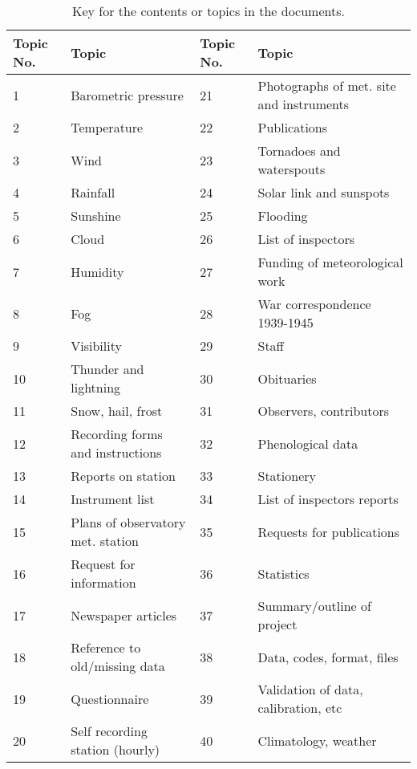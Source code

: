 \documentclass[12pt, epsfig, graphics, rotating, epsf,tifff]{article}
\begin{document}
\singlespace
\begin{table}[h!]
\vspace{-0.8cm}       \caption[ ]
{\footnotesize{Key for the contents or topics in the documents.}}
\label{key}
\begin{center}
\vspace{-0.4cm}\scriptsize{

\begin{tabular}{|l|l||l|l|}

\hline
Topic No. & Topic&Topic No. & Topic\\
\hline

1 & Barometric pressure                                &21&  Photographs of met. site and instruments\\
2 & Temperature 				       &22&  Publications				       \\
3 & Wind					       &23&  Tornadoes and waterspouts\\
4 & Rainfall					       &24&  Solar link and sunspots  \\
5 & Sunshine					       &25&  Flooding		\\
6 & Cloud					       &26&  List of inspectors \\
7 & Humidity					       &27&  Funding of meteorological work\\
8 &  Fog					       &28&  War correspondence 1939-1945  \\
9 &  Visibility 	      			       &29&  Staff	  \\
10&  Thunder and lightning    			       &30&  Obituaries   \\
11&  Snow, hail, frost  	     		       &31&  Observers, contributors  \\
12&  Recording forms and instructions		       &32&  Phenological data \\
13&  Reports on station 			       &33&  Stationery 	       \\
14&  Instrument list				       &34&  List of inspectors reports\\
15&  Plans of observatory met. station       &35&  Requests for publications\\
16&  Request for information			       &36& Statistics  	    \\
17&  Newspaper articles 			       &37& Summary/outline of project     \\
18&  Reference to old/missing data	       &38& Data, codes, format, files \\
19&  Questionnaire		    		        &39& Validation of data, calibration, etc  \\
20&  Self recording station (hourly)		       &40& Climatology, weather		  \\
						       


\hline
   \end{tabular}
}
\end{center}
\end{table}			
\end{document}
